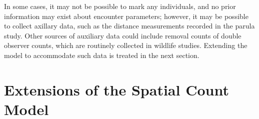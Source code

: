 In some cases, it may not be possible to mark any individuals, and no
prior information may exist about encounter parameters; however, it
may be possible to collect axillary data, such as the distance
measurements recorded in the parula study.
Other sources of auxiliary data could include removal counts of
double observer counts, which are routinely collected in
wildlife studies. Extending the model to accommodate such data is
treated in the next section.




\section{Extensions of the Spatial Count Model}
\label{unmarked.sec.ext}




